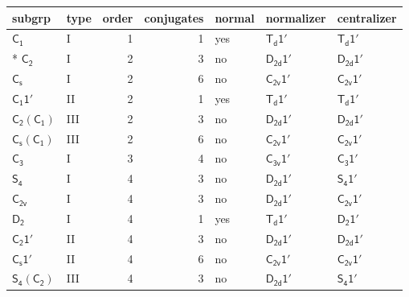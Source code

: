 \documentclass[10pt,a4paper]{article}
\numberwithin{equation}{section}
\newcommand{\grp}[1]{\mathsf{#1}}
\begin{document}
{\small\begin{longtable}{@{}llrrlll@{}}\toprule
subgrp & type & order & conjugates & normal & normalizer & centralizer\\\midrule\endhead
\bottomrule\endfoot\endlastfoot
\href{../../../rotation/data/pdf/C1.pdf}{$\grp{C_{1}}$} & I & 1 & 1 & yes & \href{Td-1p.pdf}{$\grp{T_{d}1'}$} & \href{Td-1p.pdf}{$\grp{T_{d}1'}$}\\*
\href{../../../rotation/data/pdf/C2.pdf}{$\grp{C_{2}}$} & I & 2 & 3 & no & \href{D2d-1p.pdf}{$\grp{D_{2d}1'}$} & \href{D2d-1p.pdf}{$\grp{D_{2d}1'}$}\\
\href{../../../rotation/data/pdf/C1v.pdf}{$\grp{C_{s}}$} & I & 2 & 6 & no & \href{C2v-1p.pdf}{$\grp{C_{2v}1'}$} & \href{C2v-1p.pdf}{$\grp{C_{2v}1'}$}\\
\href{C1-1p.pdf}{$\grp{C_{1}1'}$} & II & 2 & 1 & yes & \href{Td-1p.pdf}{$\grp{T_{d}1'}$} & \href{Td-1p.pdf}{$\grp{T_{d}1'}$}\\
\href{C2-C1.pdf}{$\grp{C_{2}}(\grp{C_{1}})$} & III & 2 & 3 & no & \href{D2d-1p.pdf}{$\grp{D_{2d}1'}$} & \href{D2d-1p.pdf}{$\grp{D_{2d}1'}$}\\
\href{C1v-C1.pdf}{$\grp{C_{s}}(\grp{C_{1}})$} & III & 2 & 6 & no & \href{C2v-1p.pdf}{$\grp{C_{2v}1'}$} & \href{C2v-1p.pdf}{$\grp{C_{2v}1'}$}\\
\href{../../../rotation/data/pdf/C3.pdf}{$\grp{C_{3}}$} & I & 3 & 4 & no & \href{C3v-1p.pdf}{$\grp{C_{3v}1'}$} & \href{C3-1p.pdf}{$\grp{C_{3}1'}$}\\
\href{../../../rotation/data/pdf/S4.pdf}{$\grp{S_{4}}$} & I & 4 & 3 & no & \href{D2d-1p.pdf}{$\grp{D_{2d}1'}$} & \href{S4-1p.pdf}{$\grp{S_{4}1'}$}\\
\href{../../../rotation/data/pdf/C2v.pdf}{$\grp{C_{2v}}$} & I & 4 & 3 & no & \href{D2d-1p.pdf}{$\grp{D_{2d}1'}$} & \href{C2v-1p.pdf}{$\grp{C_{2v}1'}$}\\
\href{../../../rotation/data/pdf/D2.pdf}{$\grp{D_{2}}$} & I & 4 & 1 & yes & \href{Td-1p.pdf}{$\grp{T_{d}1'}$} & \href{D2-1p.pdf}{$\grp{D_{2}1'}$}\\
\href{C2-1p.pdf}{$\grp{C_{2}1'}$} & II & 4 & 3 & no & \href{D2d-1p.pdf}{$\grp{D_{2d}1'}$} & \href{D2d-1p.pdf}{$\grp{D_{2d}1'}$}\\
\href{C1v-1p.pdf}{$\grp{C_{s}1'}$} & II & 4 & 6 & no & \href{C2v-1p.pdf}{$\grp{C_{2v}1'}$} & \href{C2v-1p.pdf}{$\grp{C_{2v}1'}$}\\
\href{S4-C2.pdf}{$\grp{S_{4}}(\grp{C_{2}})$} & III & 4 & 3 & no & \href{D2d-1p.pdf}{$\grp{D_{2d}1'}$} & \href{S4-1p.pdf}{$\grp{S_{4}1'}$}\\

\end{longtable}}
\end{document}

